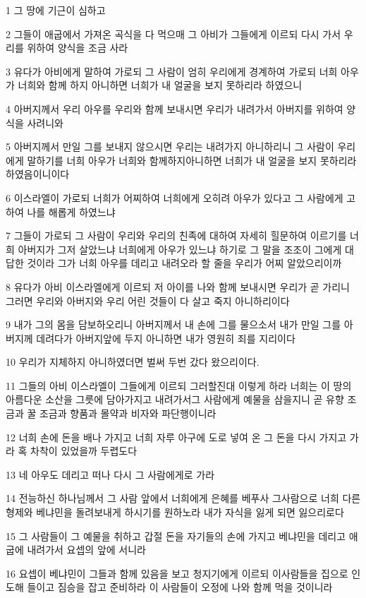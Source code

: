 \par 1 그 땅에 기근이 심하고
\par 2 그들이 애굽에서 가져온 곡식을 다 먹으매 그 아비가 그들에게 이르되 다시 가서 우리를 위하여 양식을 조금 사라
\par 3 유다가 아비에게 말하여 가로되 그 사람이 엄히 우리에게 경계하여 가로되 너희 아우가 너희와 함께 하지 아니하면 너희가 내 얼굴을 보지 못하리라 하였으니
\par 4 아버지께서 우리 아우를 우리와 함께 보내시면 우리가 내려가서 아버지를 위하여 양식을 사려니와
\par 5 아버지께서 만일 그를 보내지 않으시면 우리는 내려가지 아니하리니 그 사람이 우리에게 말하기를 너희 아우가 너희와 함께하지아니하면 너희가 내 얼굴을 보지 못하리라 하였음이니이다
\par 6 이스라엘이 가로되 너희가 어찌하여 너희에게 오히려 아우가 있다고 그 사람에게 고하여 나를 해롭게 하였느냐
\par 7 그들이 가로되 그 사람이 우리와 우리의 친족에 대하여 자세히 힐문하여 이르기를 너희 아버지가 그저 살았느냐 너희에게 아우가 있느냐 하기로 그 말을 조조이 그에게 대답한 것이라 그가 너희 아우를 데리고 내려오라 할 줄을 우리가 어찌 알았으리이까
\par 8 유다가 아비 이스라엘에게 이르되 저 아이를 나와 함께 보내시면 우리가 곧 가리니 그러면 우리와 아버지와 우리 어린 것들이 다 살고 죽지 아니하리이다
\par 9 내가 그의 몸을 담보하오리니 아버지께서 내 손에 그를 물으소서 내가 만일 그를 아버지께 데려다가 아버지앞에 두지 아니하면 내가 영원히 죄를 지리이다
\par 10 우리가 지체하지 아니하였더면 벌써 두번 갔다 왔으리이다.
\par 11 그들의 아비 이스라엘이 그들에게 이르되 그러할진대 이렇게 하라 너희는 이 땅의 아름다운 소산을 그릇에 담아가지고 내려가서그 사람에게 예물을 삼을지니 곧 유향 조금과 꿀 조금과 향품과 몰약과 비자와 파단행이니라
\par 12 너희 손에 돈을 배나 가지고 너희 자루 아구에 도로 넣여 온 그 돈을 다시 가지고 가라 혹 차착이 있었을까 두렵도다
\par 13 네 아우도 데리고 떠나 다시 그 사람에게로 가라
\par 14 전능하신 하나님께서 그 사람 앞에서 너희에게 은혜를 베푸사 그사람으로 너희 다른 형제와 베냐민을 돌려보내게 하시기를 원하노라 내가 자식을 잃게 되면 잃으리로다
\par 15 그 사람들이 그 예물을 취하고 갑절 돈을 자기들의 손에 가지고 베냐민을 데리고 애굽에 내려가서 요셉의 앞에 서니라
\par 16 요셉이 베냐민이 그들과 함께 있음을 보고 청지기에게 이르되 이사람들을 집으로 인도해 들이고 짐승을 잡고 준비하라 이 사람들이 오정에 나와 함께 먹을 것이니라

